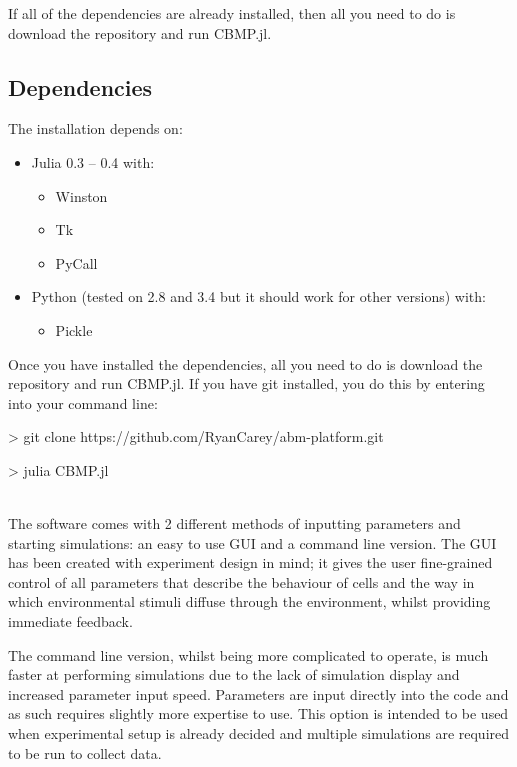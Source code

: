 \documentclass[12pt]{article}
\begin{document}
If all of the dependencies are already installed, then all you need to 
do is download the repository and run CBMP.jl.

\subsection{Dependencies}

The installation depends on:

\begin{itemize}
\item Julia 0.3 -- 0.4 with:
\begin{itemize}
\item Winston
\item Tk
\item PyCall
\end{itemize}
\item Python (tested on 2.8 and 3.4 but it should work for other 
versions) with:
\begin{itemize}
\item Pickle
\end{itemize}
\end{itemize}


Once you have installed the dependencies, all you need to do is download 
the repository and run CBMP.jl. If you have git installed, you do this 
by entering into your command line: \\

{\fontsize{10pt}{11pt} \ttfamily 
> git clone https://github.com/RyanCarey/abm-platform.git

> julia CBMP.jl} \\

The software comes with 2 different methods of inputting parameters and 
starting simulations: an easy to use GUI and a command line version. The 
GUI has been created with experiment design in mind; it gives the user 
fine-grained control of all parameters that describe the behaviour of 
cells and the way in which environmental stimuli diffuse through the 
environment, whilst providing immediate feedback.

The command line version, whilst being more complicated to operate, is 
much faster at performing simulations due to the lack of simulation 
display and increased parameter input speed. Parameters are input 
directly into the code and as such requires slightly more expertise to 
use. This option is intended to be used when experimental setup is 
already decided and multiple simulations are required to be run to 
collect data.
\end{document}

